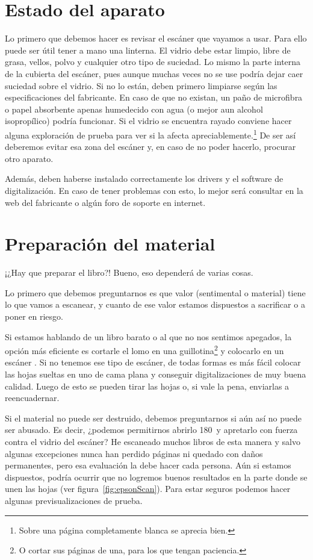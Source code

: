\documentclass[%
	a5paper,
	10pt,
	twoside,
	openright,
	final,
]{memoir}
\begin{document}
	\section{Estado del aparato\label{sec:scanningState}} Lo primero que debemos hacer es revisar el escáner que vayamos a usar. Para ello puede ser útil tener a mano una linterna. El vidrio debe estar limpio, libre de grasa, vellos, polvo y cualquier otro tipo de suciedad. Lo mismo la parte interna de la cubierta del escáner, pues aunque muchas veces no se use podría dejar caer suciedad sobre el vidrio. Si no lo están, deben primero limpiarse según las especificaciones del fabricante. En caso de que no existan, un paño de microfibra o papel absorbente apenas humedecido con agua (o mejor aun alcohol isopropílico) podría funcionar. Si el vidrio se encuentra rayado conviene hacer alguna exploración de prueba para ver si la afecta apreciablemente.\footnote{Sobre una página completamente blanca se aprecia bien.} De ser así deberemos evitar esa zona del escáner y, en caso de no poder hacerlo, procurar otro aparato.

	Además, deben haberse instalado correctamente los drivers y el software de digitalización. En caso de tener problemas con esto, lo mejor será consultar en la web del fabricante o algún foro de soporte en internet.

	\section{Preparación del material\label{sec:scanningPreparingMaterial}} ¡¿Hay que preparar el libro?! Bueno, eso dependerá de varias cosas.

	Lo primero que debemos preguntarnos es que valor (sentimental o material) tiene lo que vamos a escanear, y cuanto de ese valor estamos dispuestos a sacrificar o a poner en riesgo.

	Si estamos hablando de un libro barato o al que no nos sentimos apegados, la opción más eficiente es cortarle el lomo en una guillotina\footnote{O cortar sus páginas de una, para los que tengan paciencia.} y colocarlo en un escáner \adf. Si no tenemos ese tipo de escáner, de todas formas es más fácil colocar las hojas sueltas en uno de cama plana y conseguir digitalizaciones de muy buena calidad. Luego de esto se pueden tirar las hojas o, si vale la pena, enviarlas a reencuadernar.

	Si el material no puede ser destruido, debemos preguntarnos si aún así no puede ser abusado. Es decir, ¿podemos permitirnos abrirlo 180\textdegree\ y apretarlo con fuerza contra el vidrio del escáner? He escaneado muchos libros de esta manera y salvo algunas excepciones nunca han perdido páginas ni quedado con daños permanentes, pero esa evaluación la debe hacer cada persona. %
	Aún si estamos dispuestos, podría ocurrir que no logremos buenos resultados en la parte donde se unen las hojas (ver figura~\ref{fig:epsonScan}). Para estar seguros podemos hacer algunas previsualizaciones de prueba.
\end{document}
